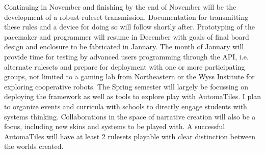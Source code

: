 Continuing in November and finishing by the end of November will be the development of a robust ruleset transmission. Documentation for transmitting these rules and a device for doing so will follow shortly after. Prototyping of the pacemaker and programmer will resume in December with goals of final board design and enclosure to be fabricated in January. The month of January will provide time for testing by advanced users programming through the API, i.e. alternate rulesets and prepare for deployment with one or more participating groups, not limited to a gaming lab from Northeastern or the Wyss Institute for exploring cooperative robots.
The Spring semester will largely be focussing on deploying the framework as well as tools to explore play with AutomaTiles. I plan to organize events and curricula with schools to directly engage students with systems thinking. Collaborations in the space of narrative creation will also be a focus, including new skins and systems to be played with. A successful AutomaTiles will have at least 2 rulesets playable with clear distinction between the worlds created.



